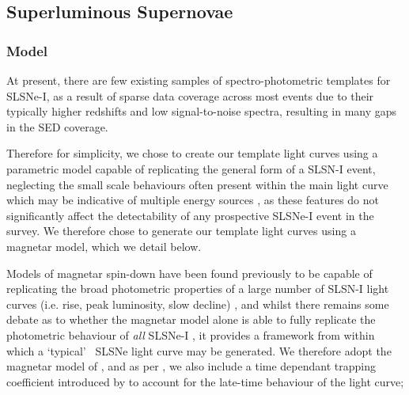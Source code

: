 \documentclass[a4paper,fleqn,usenatbib]{mnras}
\newcommand{\angus}[1]{\color{JungleGreen}#1\color{black}}
\newcommand{\comment}[1]{\textbf{[#1]}}
\begin{document}

\subsection{Superluminous Supernovae}

\subsubsection{Model}
\label{sec:simSLSN}
At present, there are few existing samples of spectro-photometric templates for SLSNe-I, as a result of sparse data coverage across most events due to their typically higher redshifts and low signal-to-noise spectra, resulting in many gaps in the SED coverage.

Therefore for simplicity, we chose to create our template light curves using a parametric model capable of replicating the general form of a SLSN-I event, neglecting the small scale behaviours often present within the main light curve which may be indicative of multiple energy sources \citep[e.g.][]{Inserra2017b}, as these features do not significantly affect the detectability of any prospective SLSNe-I event in the survey. We therefore chose to generate our template light curves using a magnetar model, which we detail below.

Models of magnetar spin-down have been found previously to be capable of replicating the broad photometric properties of a large number of SLSN-I light curves (i.e. rise, peak luminosity, slow decline) \citep{Inserra2013,Nicholl2013,Nicholl2017B,Dessart2019}, and whilst there remains some debate as to whether the magnetar model alone is able to fully replicate the photometric behaviour of {\textit{all}} SLSNe-I \citep[e.g.][]{Inserra2017b,Angus2019}, it provides a framework from within which a \lq typical\rq~ SLSNe light curve may be generated. We therefore adopt the magnetar model of \cite{Inserra2013}, and as per \cite{Prajs2016}, we also include a time dependant trapping coefficient introduced by \cite{Wange2015} to account for the late-time behaviour of the light curve;
\end{document}
